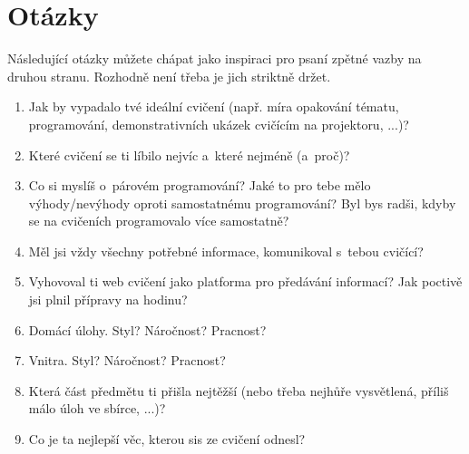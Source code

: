 \documentclass[12pt,a5paper]{article}
\begin{document}
\newpage

\section*{Otázky}

Následující otázky můžete chápat jako inspiraci pro psaní zpětné vazby na
druhou stranu. Rozhodně není třeba je jich striktně držet.

\begin{enumerate}
	\item Jak by vypadalo tvé ideální cvičení (např. míra opakování tématu,
		  programování, demonstrativních ukázek cvičícím na projektoru, ...)?
	\item Které cvičení se ti líbilo nejvíc a~které nejméně (a~proč)?
	\item Co si myslíš o~párovém programování? Jaké to pro tebe mělo
		  výhody/nevýhody oproti samostatnému programování? Byl bys radši,
		  kdyby se na cvičeních programovalo více samostatně?
	\item Měl jsi vždy všechny potřebné informace, komunikoval s~tebou cvičící?
	\item Vyhovoval ti web cvičení jako platforma pro předávání informací?
		  Jak poctivě jsi plnil přípravy na hodinu?
	\item Domácí úlohy. Styl? Náročnost? Pracnost?
	\item Vnitra. Styl? Náročnost? Pracnost?
	\item Která část předmětu ti přišla nejtěžší (nebo třeba nejhůře
	      vysvětlená, příliš málo úloh ve sbírce, ...)?
	\item Co je ta nejlepší věc, kterou sis ze cvičení odnesl?
\end{enumerate}
\end{document}
